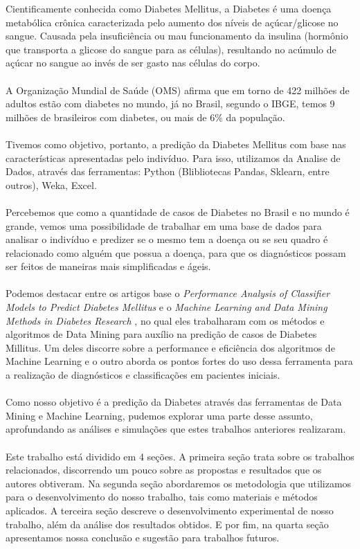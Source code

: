 \documentclass[12pt]{article}
\begin{document}
Cientificamente conhecida como Diabetes Mellitus, a Diabetes é uma doença metabólica crônica caracterizada pelo aumento dos níveis de açúcar/glicose no sangue. Causada pela insuficiência ou mau funcionamento da insulina (hormônio que transporta a glicose do sangue para as células), resultando no acúmulo de açúcar no sangue ao invés de ser gasto nas células do corpo.\\\\
A Organização Mundial de Saúde (OMS) afirma que em torno de 422 milhões de adultos estão com diabetes no mundo, já no Brasil, segundo o IBGE, temos 9 milhões de brasileiros com diabetes, ou mais de 6\% da população.\\\\
Tivemos como objetivo, portanto, a predição da Diabetes Mellitus com base nas características apresentadas pelo indivíduo. Para isso, utilizamos da Analise de Dados, através das ferramentas: Python (Blibliotecas Pandas, Sklearn, entre outros), Weka, Excel.\\\\
Percebemos que como a quantidade de casos de Diabetes no Brasil e no mundo é grande, vemos uma possibilidade de trabalhar em uma base de dados para analisar o indivíduo e predizer se o mesmo tem a doença ou se seu quadro é relacionado como alguém que possua a doença, para que os diagnósticos possam ser feitos de maneiras mais simplificadas e ágeis.\\\\
Podemos destacar entre os artigos base o \textit{Performance Analysis of Classifier Models to Predict Diabetes Mellitus} \cite{KANDHASAMY201545} e o \textit{Machine Learning and Data Mining Methods in Diabetes Research} \cite{KAVAKIOTIS2017104}, no qual eles trabalharam com os métodos e algoritmos de Data Mining para auxílio na predição de casos de Diabetes Millitus. Um deles discorre sobre a performance e eficiência dos algoritmos de Machine Learning e o outro aborda os pontos fortes do uso dessa ferramenta para a realização de diagnósticos e classificações em pacientes iniciais.\\\\
Como nosso objetivo é a predição da Diabetes através das ferramentas de Data Mining e Machine Learning, pudemos explorar uma parte desse assunto, aprofundando as análises e simulações que estes trabalhos anteriores realizaram.\\\\
Este trabalho está dividido em 4 seções. A primeira seção trata sobre os trabalhos relacionados, discorrendo um pouco sobre as propostas e resultados que os autores obtiveram. Na segunda seção abordaremos os metodologia que utilizamos para o desenvolvimento do nosso trabalho, tais como materiais e métodos aplicados. A terceira seção descreve o desenvolvimento experimental de nosso trabalho, além da análise dos resultados obtidos. E por fim, na quarta seção apresentamos nossa conclusão e sugestão para trabalhos futuros.
\end{document}
